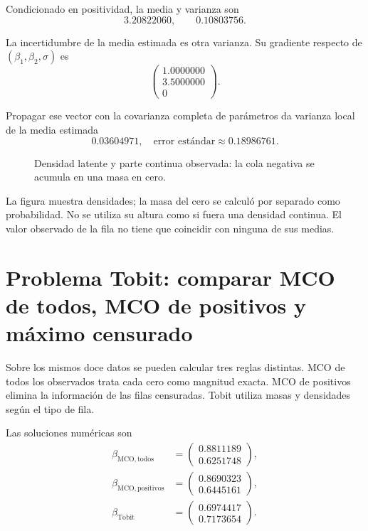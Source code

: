 \documentclass[11pt,a4paper]{article}
\begin{document}
Condicionado en positividad,
la media y varianza son
\[
3.20822060,\qquad 0.10803756.
\]

La incertidumbre de la media estimada
es otra varianza.
Su gradiente respecto de
\((\beta_1,\beta_2,\sigma)\) es
\[
\begin{pmatrix}1.0000000\\3.5000000\\0\end{pmatrix}.
\]

Propagar ese vector con la
covarianza completa de parámetros
da varianza local de la
media estimada
\[
0.03604971,\quad\text{error estándar}\approx0.18986761.
\]

\begin{figure}[H]\centering
{}
\caption{Densidad latente y parte continua observada: la cola negativa se acumula en una masa en cero.}
\end{figure}

La figura muestra densidades;
la masa del cero se calculó
por separado como probabilidad.
No se utiliza su altura
como si fuera una densidad continua.
El valor observado de la fila
no tiene que coincidir
con ninguna de sus medias.

\clearpage
\section{Problema Tobit: comparar MCO de todos, MCO de positivos y máximo censurado}\label{unidad120}
Sobre los mismos doce datos se pueden
calcular tres reglas distintas.
MCO de todos los observados trata
cada cero como magnitud exacta.
MCO de positivos elimina la
información de las filas censuradas.
Tobit utiliza masas y densidades
según el tipo de fila.

Las soluciones numéricas son
\[
\begin{aligned}
\widehat\beta_{\mathrm{MCO,todos}}&=\begin{pmatrix}0.8811189\\0.6251748\end{pmatrix},\\
\widehat\beta_{\mathrm{MCO,positivos}}&=\begin{pmatrix}0.8690323\\0.6445161\end{pmatrix},\\
\widehat\beta_{\mathrm{Tobit}}&=\begin{pmatrix}0.6974417\\0.7173654\end{pmatrix}.\end{aligned}
\]
\end{document}
